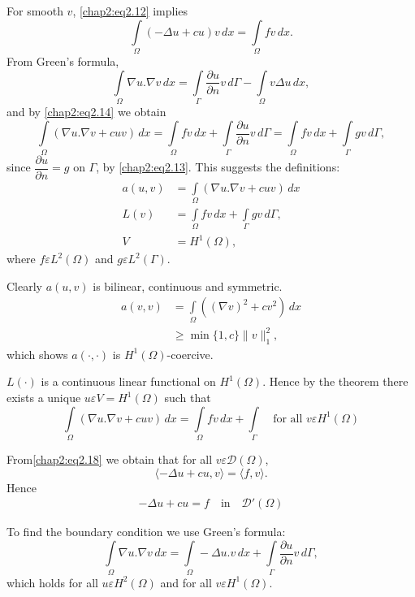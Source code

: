 For smooth $v$, \eqref{chap2:eq2.12} implies
\begin{equation}\label{chap2:eq2.14}
\int\limits_\Omega(-\Delta u+cu)v\,dx=\int\limits_\Omega fv\,dx.
\end{equation}\pageoriginale
From Green's formula,
$$
\int\limits_\Omega \nabla u. \nabla v\,dx=\int\limits_\Gamma
\frac{\partial u}{\partial n}v\, d\Gamma -\int\limits_\Omega v\Delta
u\,dx,
$$
and by \eqref{chap2:eq2.14} we obtain
$$
\int\limits_\Omega(\nabla u.\nabla v+ cu v)\,dx=\int\limits_\Omega fv\,dx+
\int\limits_\Gamma\frac{\partial u}{\partial n}v \, d\Gamma =
\int\limits_\Omega fv\,dx+\int\limits_\Gamma gv\,d\Gamma,
$$
since $\dfrac{\partial u}{\partial n} = g$ on $\Gamma$, by
\eqref{chap2:eq2.13}. This suggests the definitions: 
\begin{align}\label{chap2:eq2.15}
a(u, v) &=\int\limits_\Omega(\nabla u.\nabla v+cuv)\,dx\\\label{chap2:eq2.16}
L(v) &=\int\limits_\Omega fv\,dx +\int\limits_\Gamma gv\,
d\Gamma,\\ 
V &= H^1(\Omega),\label{chap2:eq2.17}
\end{align}
where $f\varepsilon L^2(\Omega)$ and $g\varepsilon L^2(\Gamma)$.

Clearly $a(u, v)$ is bilinear, continuous and symmetric.
\begin{align*}
a(v, v) &= \int\limits_\Omega \left((\nabla v)^2+cv^2\right)\,dx\\
&\geq \min\{1, c\}\parallel v\parallel_1^2,
\end{align*}
which shows $a(\cdot,\cdot)$ is $H^1(\Omega)$-coercive.

$L(\cdot)$ is a continuous linear functional on $H^1(\Omega)$. Hence
by the theorem there exists a unique $u\varepsilon V=H^1(\Omega)$ such
that 
\begin{equation}\label{chap2:eq2.18}
\int\limits_\Omega(\nabla u.\nabla v+cuv)\,dx=\int\limits_\Omega fv\,dx+
\int\limits_\Gamma\quad\text{for all } v\varepsilon H^1(\Omega)
\end{equation}


From\pageoriginale \eqref{chap2:eq2.18} we obtain that for all
$v\varepsilon\mathscr{D}(\Omega)$,
$$
\langle -\Delta u+cu, v\rangle= \langle f, v \rangle.
$$
Hence
\begin{align}\label{chap2:eq2.19}
-\Delta u+cu=f\quad\text{in}\quad\mathscr{D}'(\Omega)
\end{align}

To find the boundary condition we use Green's formula:
$$
\int\limits_\Omega\nabla u.\nabla v\,dx =\int\limits_\Omega -\Delta
u.v\,dx +\int\limits_\Gamma\frac{\partial u}{\partial n}v\, d\Gamma,
$$
which holds for all $u\varepsilon H^2(\Omega)$ and for all
$v\varepsilon H^1(\Omega)$.

